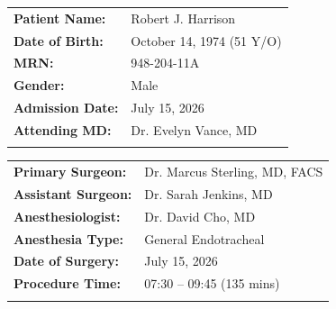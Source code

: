 \documentclass[10pt]{article}
\begin{document}
\noindent
\begin{minipage}[t]{0.49\textwidth}
  \begin{tcolorbox}[
    colback=lightbg,
    colframe=secondarycolor,
    coltitle=white,
    title={\bfseries\sffamily PATIENT DEMOGRAPHICS},
    arc=1.5mm,
    boxrule=1pt,
    valign=top,
    height=4.2cm,
    left=8pt, right=8pt, top=6pt, bottom=6pt
  ]
    \fontsize{8.5}{12}\selectfont\sffamily
    \begin{tabular}{@{}ll@{}}
      \textbf{Patient Name:} & Robert J. Harrison \\{}
      \textbf{Date of Birth:} & October 14, 1974 (51 Y/O) \\{}
      \textbf{MRN:} & 948-204-11A \\{}
      \textbf{Gender:} & Male \\{}
      \textbf{Admission Date:} & July 15, 2026 \\{}
      \textbf{Attending MD:} & Dr. Evelyn Vance, MD \\{}
    \end{tabular}
  \end{tcolorbox}
\end{minipage}%
\hfill
\begin{minipage}[t]{0.49\textwidth}
  \begin{tcolorbox}[
    colback=lightbg,
    colframe=secondarycolor,
    coltitle=white,
    title={\bfseries\sffamily SURGICAL ENCOUNTER},
    arc=1.5mm,
    boxrule=1pt,
    valign=top,
    height=4.2cm,
    left=8pt, right=8pt, top=6pt, bottom=6pt
  ]
    \fontsize{8.5}{12}\selectfont\sffamily
    \begin{tabular}{@{}ll@{}}
      \textbf{Primary Surgeon:} & Dr. Marcus Sterling, MD, FACS \\{}
      \textbf{Assistant Surgeon:} & Dr. Sarah Jenkins, MD \\{}
      \textbf{Anesthesiologist:} & Dr. David Cho, MD \\{}
      \textbf{Anesthesia Type:} & General Endotracheal \\{}
      \textbf{Date of Surgery:} & July 15, 2026 \\{}
      \textbf{Procedure Time:} & 07:30 -- 09:45 (135 mins) \\{}
    \end{tabular}
  \end{tcolorbox}
\end{minipage}

\vspace{0.8em}
\end{document}

